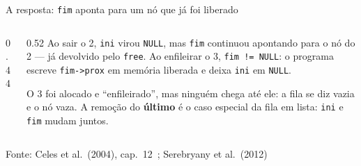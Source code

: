 \documentclass[aspectratio=169]{beamer}
\newcommand{\fonte}[1]{\vfill\hfill{\scriptsize\textcolor{UFSGray}{Fonte: #1}}}
\begin{document}
\begin{frame}{A resposta: \texttt{fim} aponta para um nó que já foi liberado}
  \begin{columns}[c]
    \begin{column}{0.44\textwidth}
      \begin{center}
      \end{center}
    \end{column}
    \begin{column}{0.52\textwidth}
      \small
      Ao sair o 2, \texttt{ini} virou \texttt{NULL}, mas \texttt{fim}
      continuou apontando para o nó do 2 --- já devolvido pelo
      \texttt{free}. Ao enfileirar o 3, \texttt{fim != NULL}: o programa
      escreve \texttt{fim->prox} em memória liberada e deixa \texttt{ini}
      em \texttt{NULL}.

      \medskip
      O 3 foi alocado e ``enfileirado'', mas ninguém chega até ele: a fila
      se diz vazia e o nó vaza. A remoção do \textbf{último} é o caso
      especial da fila em lista: \texttt{ini} e \texttt{fim} mudam juntos.
    \end{column}
  \end{columns}
  \fonte{Celes et al.\ (2004), cap.~12~\cite{celes2004introducao};
    Serebryany et al.\ (2012)~\cite{serebryany2012asan}}
\end{frame}
\end{document}
